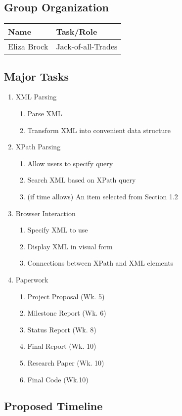 \documentclass[12pt,letterpaper,final]{article}
\begin{document}
\subsection{Group Organization}
\begin{tabular}{|l|l|}
\hline
Name		&	Task/Role \\
\hline
Eliza Brock &	Jack-of-all-Trades \\
\hline
\end{tabular}
\subsection{Major Tasks}
\begin{enumerate}
\item XML Parsing
	\begin{enumerate}
	\item Parse XML
	\item Transform XML into convenient data structure
	\end{enumerate}	
\item XPath Parsing
	\begin{enumerate}
	\item Allow users to specify query
	\item Search XML based on XPath query
	\item (if time allows) An item selected from Section 1.2
	\end{enumerate}	
\item	Browser Interaction
	\begin{enumerate}
	\item 	Specify XML to use
	\item 	Display XML in visual form
	\item 	Connections between XPath and XML elements
	\end{enumerate}	
\item	Paperwork
	\begin{enumerate}
	\item 	Project Proposal (Wk. 5)
	\item 	Milestone Report (Wk. 6)
	\item 	Status Report (Wk. 8)
	\item 	Final Report (Wk. 10)
	\item 	Research Paper (Wk. 10)
	\item 	Final Code (Wk.10)
	\end{enumerate}	
\end{enumerate}
\subsection{Proposed Timeline}
\end{document}
